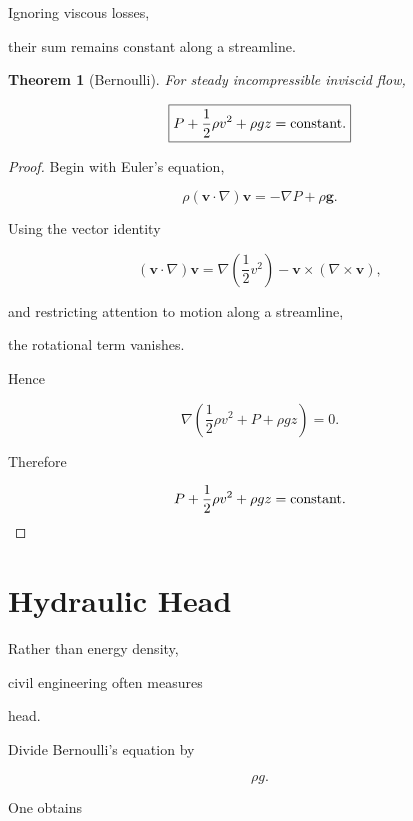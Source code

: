 \documentclass[11pt,fleqn]{book}
\numberwithin{equation}{chapter}
\theoremstyle{plain}
\newtheorem{theorem}{Theorem}[chapter]
\theoremstyle{definition}
\theoremstyle{remark}
\begin{document}

Ignoring viscous losses,

their sum remains constant along a streamline.


\begin{theorem}[Bernoulli]

For steady incompressible inviscid flow,

\[
\boxed{
P
+
\frac12\rho v^2
+
\rho gz
=
{\rm constant}.
}
\]

\end{theorem}


\begin{proof}

Begin with Euler's equation,

\[
\rho
(\mathbf v\cdot\nabla)\mathbf v
=
-
\nabla P
+
\rho\mathbf g.
\]

Using the vector identity

\[
(\mathbf v\cdot\nabla)\mathbf v
=
\nabla
\left(
\frac12v^2
\right)
-
\mathbf v
\times
(\nabla\times\mathbf v),
\]

and restricting attention to motion along a streamline,

the rotational term vanishes.

Hence

\[
\nabla
\left(
\frac12\rho v^2
+
P
+
\rho gz
\right)
=
0.
\]

Therefore

\[
P
+
\frac12\rho v^2
+
\rho gz
=
{\rm constant}.
\]

\end{proof}


\section{Hydraulic Head}

Rather than energy density,

civil engineering often measures

head.

Divide Bernoulli's equation by

\[
\rho g.
\]

One obtains
\end{document}
